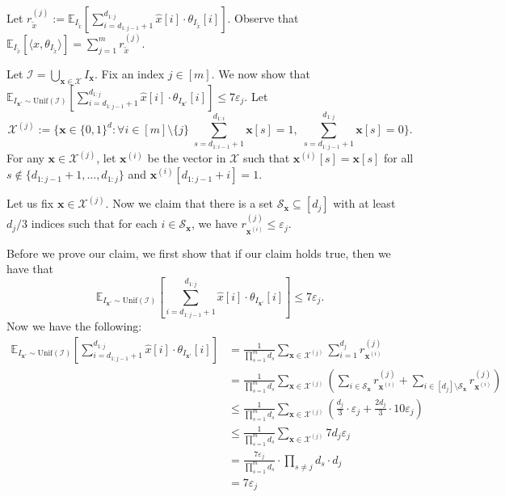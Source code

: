 Let $r^{(j)}_{\tilde x}:=\mathbb{E}_{I_{\tilde x}}[\sum_{i=d_{1:j-1}+1}^{d_{1:j}}\widehat{x}[i]\cdot \theta_{I_{\tilde x}}[i]]$. Observe that $\mathbb{E}_{I_{\tilde x}}[\langle \widehat{x},\theta_{I_{\tilde x}}\rangle]=\sum_{j=1}^m r^{(j)}_{\tilde x}$.

    
    
    Let $\mathcal{I}=\bigcup_{\mathbf{x}\in\mathcal{X}}I_{\mathbf{x}}$. Fix an index $j\in[m]$. We now show that $\mathbb{E}_{I_{\mathbf{x}'}\sim \mathrm{Unif}(\mathcal{I})}[\sum_{i=d_{1:j-1}+1}^{d_{1:j}}\widehat{x}[i]\cdot \theta_{I_{\mathbf{x}'}}[i]]\leq 7\varepsilon_j$. Let $$\mathcal{X}^{(j)}:=\Bigg\{\mathbf{x}\in \{0,1\}^d: \forall i\in[m]\setminus\{j\}\; \sum_{s=d_{1:i-1}+1}^{d_{1:i}}\mathbf{x}[s]=1,\; \sum_{s=d_{1:j-1}+1}^{d_{1:j}}\mathbf{x}[s]=0\Bigg\}.$$ For any $\mathbf{x}\in \mathcal{X}^{(j)}$, let $\mathbf{x}^{(i)}$ be the vector in $\mathcal{X}$ such that $\mathbf{x}^{(i)}[s]=\mathbf{x}[s]$ for all $s\notin \{d_{1:j-1}+1,\ldots,d_{1:j}\}$ and $\mathbf{x}^{(i)}[d_{1:j-1}+i]=1$.

    Let us fix $\mathbf{x}\in \mathcal{X}^{(j)}$. Now we claim that there is a set $\mathcal{S}_{\mathbf{x}}\subseteq[d_j]$ with at least $d_j/3$ indices such that for each $i\in \mathcal{S}_\mathbf{x}$, we have $r^{(j)}_{\mathbf{x}^{(i)}} \leq \varepsilon_j$.
    
    Before we prove our claim, we first show that if our claim holds true, then we have that $$\mathbb{E}_{I_{\mathbf{x}'}\sim \mathrm{Unif}(\mathcal{I})}[\sum_{i=d_{1:j-1}+1}^{d_{1:j}}\widehat{x}[i]\cdot \theta_{I_{\mathbf{x}'}}[i]]\leq 7\varepsilon_j.$$ Now we have the following:
    \begin{align*}
        \mathbb{E}_{I_{\mathbf{x}'}\sim \mathrm{Unif}(\mathcal{I})}[\sum_{i=d_{1:j-1}+1}^{d_{1:j}}\widehat{x}[i]\cdot \theta_{I_{\mathbf{x}'}}[i]]&=\frac{1}{\prod_{s=1}^md_s}\sum_{\mathbf{x}\in\mathcal{X}^{(j)}}\sum_{i=1}^{d_j} r^{(j)}_{\mathbf{x}^{(i)}} \\
        &= \frac{1}{\prod_{s=1}^md_s}\sum_{\mathbf{x}\in\mathcal{X}^{(j)}}\left(\sum_{i\in \mathcal{S}_{\mathbf{x}}}r^{(j)}_{\mathbf{x}^{(i)}}+\sum_{i\in [d_j]\setminus\mathcal{S}_{\mathbf{x}}}r^{(j)}_{\mathbf{x}^{(i)}}\right)\\
        &\leq \frac{1}{\prod_{s=1}^md_s}\sum_{\mathbf{x}\in\mathcal{X}^{(j)}}\left(\frac{d_j}{3}\cdot \varepsilon_j+\frac{2d_j}{3}\cdot 10\varepsilon_j\right)\\
        &\leq \frac{1}{\prod_{s=1}^md_s}\sum_{\mathbf{x}\in\mathcal{X}^{(j)}}7d_j\varepsilon_j  \\
        & = \frac{7\varepsilon_j}{\prod_{s=1}^md_s} \cdot \prod_{s\neq j}d_s\cdot d_j \\
        & = 7\varepsilon_j
    \end{align*}

